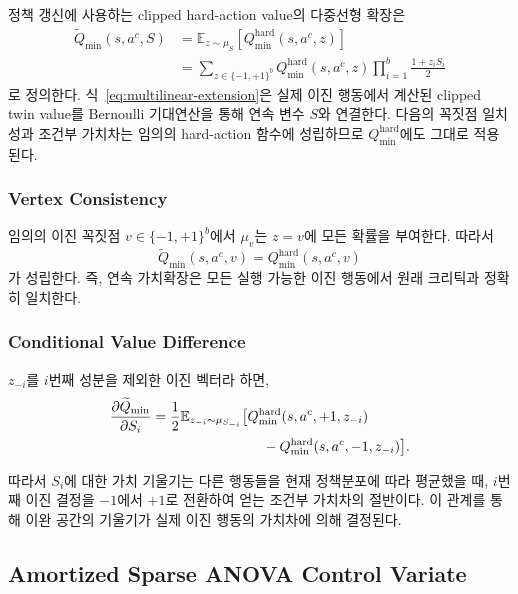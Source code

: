 \documentclass[10pt,journal]{IEEEtran}
\newcommand{\E}{\mathbb{E}}
\begin{document}
정책 갱신에 사용하는 clipped hard-action value의 다중선형 확장은
\begin{align}
\widetilde Q_{\min}(s,a^c,S)
&=
\E_{z\sim\mu_S}
\left[
Q_{\min}^{\mathrm{hard}}(s,a^c,z)
\right]
\nonumber\\
&=
\sum_{z\in\{-1,+1\}^b}
Q_{\min}^{\mathrm{hard}}(s,a^c,z)
\prod_{i=1}^{b}
\frac{1+z_iS_i}{2}
\label{eq:multilinear-extension}
\end{align}
로 정의한다. 식~\eqref{eq:multilinear-extension}은 실제 이진 행동에서 계산된 clipped twin value를 Bernoulli 기대연산을 통해 연속 변수 $S$와 연결한다. 다음의 꼭짓점 일치성과 조건부 가치차는 임의의 hard-action 함수에 성립하므로 $Q_{\min}^{\mathrm{hard}}$에도 그대로 적용된다.


\subsubsection{Vertex Consistency}

임의의 이진 꼭짓점
$v\in\{-1,+1\}^b$에서 $\mu_v$는 $z=v$에 모든 확률을 부여한다. 따라서
\begin{equation}
\widetilde Q_{\min}(s,a^c,v)
=
Q_{\min}^{\mathrm{hard}}(s,a^c,v)
\label{eq:vertex-consistency}
\end{equation}
가 성립한다. 즉, 연속 가치확장은 모든 실행 가능한 이진 행동에서 원래 크리틱과 정확히 일치한다.


\subsubsection{Conditional Value Difference}

$z_{-i}$를 $i$번째 성분을 제외한 이진 벡터라 하면,
\begin{align}
\frac{\partial\widetilde Q_{\min}}{\partial S_i}
&=
\frac{1}{2}
\E_{z_{-i}\sim\mu_{S_{-i}}}
\big[
Q_{\min}^{\mathrm{hard}}(s,a^c,+1,z_{-i})
\nonumber\\
&\hspace{28mm}
-
Q_{\min}^{\mathrm{hard}}(s,a^c,-1,z_{-i})
\big].
\label{eq:conditional-difference}
\end{align}

따라서 $S_i$에 대한 가치 기울기는 다른 행동들을 현재 정책분포에 따라 평균했을 때, $i$번째 이진 결정을 $-1$에서 $+1$로 전환하여 얻는 조건부 가치차의 절반이다. 이 관계를 통해 이완 공간의 기울기가 실제 이진 행동의 가치차에 의해 결정된다.


\subsection{Amortized Sparse ANOVA Control Variate}
\end{document}
